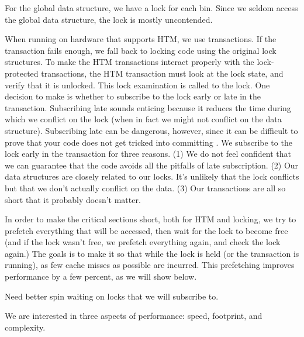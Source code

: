 \documentclass[pldi]{sigplanconf-pldi15}
\begin{document}
For the global data structure, we have a lock for each bin.  Since we
seldom access the global data structure, the lock is mostly
uncontended.

When running on hardware that supports HTM, we use transactions.  If
the transaction fails enough, we fall back to locking code using the
original lock structures.  To make the HTM transactions interact
properly with the lock-protected transactions, the HTM transaction
must look at the lock state, and verify that it is unlocked.  This
lock examination is called  to the lock.  One
decision to make is whether to subscribe to the lock early or late in
the transaction.  Subscribing late sounds enticing because it reduces
the time during which we conflict on the lock (when in fact we might
not conflict on the data structure).  Subscribing late can be
dangerous, however, since it can be difficult to prove that your code
does not get tricked into committing \cite{DiceHaKo14}.  We subscribe
to the lock early in the transaction for three reasons.  (1) We do not
feel confident that we can guarantee that the code avoids all the
pitfalls of late subscription.  (2) Our data structures are closely
related to our locks.  It's unlikely that the lock conflicts but that
we don't actually conflict on the data.  (3) Our transactions are all
so short that it probably doesn't matter.

In order to make the critical sections short, both for HTM and
locking, we try to prefetch everything that will be accessed, then
wait for the lock to become free (and if the lock wasn't free, we
prefetch everything again, and check the lock again.)  The goals is to
make it so that while the lock is held (or the transaction is
running), as few cache misses as possible are incurred.  This
prefetching improves performance by a few percent, as we will show
below.

Need better spin waiting on locks that we will subscribe to.


We are interested in three aspects of performance: speed, footprint,
and complexity.
\end{document}
